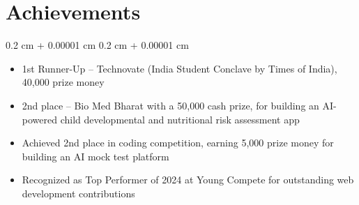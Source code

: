 \documentclass[10pt, letterpaper]{article}
\newenvironment{highlights}{
    \begin{itemize}[
        topsep=0.10 cm,
        parsep=0.10 cm,
        partopsep=0pt,
        itemsep=0pt,
        leftmargin=0.4 cm + 10pt
    ]
}{
    \end{itemize}
} %
\newenvironment{onecolentry}{
    \begin{adjustwidth}{
        0.2 cm + 0.00001 cm
    }{
        0.2 cm + 0.00001 cm
    }
}{
    \end{adjustwidth}
} %
\let\hrefWithoutArrow\href
\renewcommand{\href}[2]{\hrefWithoutArrow{#1}{\ifthenelse{\equal{#2}{}}{ }{#2 }\raisebox{.15ex}{\footnotesize \faExternalLink*}}}
\begin{document}
    \section{Achievements}
    \begin{onecolentry}
        \begin{highlights}
            \item 1st Runner-Up – Technovate (India Student Conclave by Times of India), 40,000 prize money \href{https://lnkd.in/p/dACwTd-S}{\faLinkedin}
            \item 2nd place – Bio Med Bharat with a 50,000 cash prize, for building an AI-powered child developmental and nutritional risk assessment app \href{https://github.com/deadhearth01/poshan-biomed}{\faGithub} \href{https://lnkd.in/p/dA8nVGFw}{\faLinkedin} \href{https://creds.gitam.edu/c/28afb00f0dbd45a4b08b255631ef1d70}{\faCertificate}
            \item Achieved 2nd place in coding competition, earning 5,000 prize money for building an AI mock test platform
            \item Recognized as Top Performer of 2024 at Young Compete for outstanding web development contributions
        \end{highlights}
    \end{onecolentry}
\end{document}
